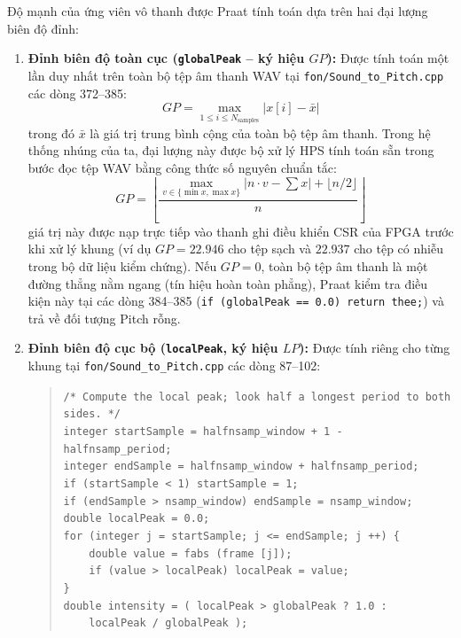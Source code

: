 Độ mạnh của ứng viên vô thanh được Praat tính toán dựa trên hai đại lượng biên độ đỉnh:
\begin{enumerate}
    \item \textbf{Đỉnh biên độ toàn cục (\texttt{globalPeak} -- ký hiệu $GP$):} Được tính toán một lần duy nhất trên toàn bộ tệp âm thanh WAV tại \texttt{fon/Sound\_to\_Pitch.cpp} các dòng 372--385:
    \begin{equation}
        GP = \max_{1 \le i \le N_{\text{samples}}} |x[i] - \bar{x}|
    \end{equation}
    trong đó $\bar{x}$ là giá trị trung bình cộng của toàn bộ tệp âm thanh. Trong hệ thống nhúng của ta, đại lượng này được bộ xử lý HPS tính toán sẵn trong bước đọc tệp WAV bằng công thức số nguyên chuẩn tắc:
    \begin{equation}
        GP = \left\lfloor \frac{\max\limits_{v \in \{\min x, \max x\}} |n \cdot v - \sum x| + \lfloor n/2 \rfloor}{n} \right\rfloor
    \end{equation}
    giá trị này được nạp trực tiếp vào thanh ghi điều khiển CSR của FPGA trước khi xử lý khung (ví dụ $GP = 22.946$ cho tệp sạch và $22.937$ cho tệp có nhiễu trong bộ dữ liệu kiểm chứng). Nếu $GP = 0$, toàn bộ tệp âm thanh là một đường thẳng nằm ngang (tín hiệu hoàn toàn phẳng), Praat kiểm tra điều kiện này tại các dòng 384--385 (\texttt{if (globalPeak == 0.0) return thee;}) và trả về đối tượng Pitch rỗng.

    \item \textbf{Đỉnh biên độ cục bộ (\texttt{localPeak}, ký hiệu $LP$):} Được tính riêng cho từng khung tại \texttt{fon/Sound\_to\_Pitch.cpp} các dòng 87--102:
    \begin{quote}
    \footnotesize
    \texttt{/* Compute the local peak; look half a longest period to both sides. */}\\
    \texttt{integer startSample = halfnsamp\_window + 1 - halfnsamp\_period;}\\
    \texttt{integer endSample = halfnsamp\_window + halfnsamp\_period;}\\
    \texttt{if (startSample < 1) startSample = 1;}\\
    \texttt{if (endSample > nsamp\_window) endSample = nsamp\_window;}\\
    \texttt{double localPeak = 0.0;}\\
    \texttt{for (integer j = startSample; j <= endSample; j ++) \{}\\
    \texttt{\ \ \ \ double value = fabs (frame [j]);}\\
    \texttt{\ \ \ \ if (value > localPeak) localPeak = value;}\\
    \texttt{\}}\\
    \texttt{double intensity = ( localPeak > globalPeak ? 1.0 :}\\
    \texttt{\ \ \ \ localPeak / globalPeak );}
    \end{quote}
\end{enumerate}

